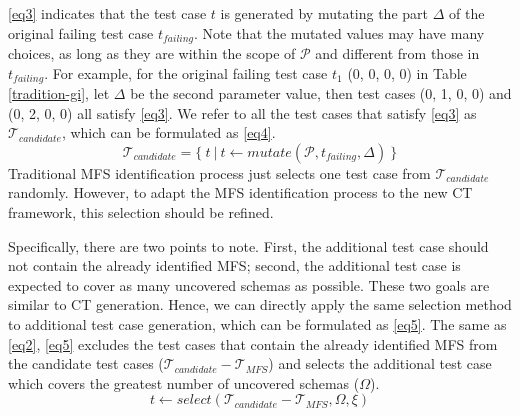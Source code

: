 \documentclass[journal,12pt,onecolumn,draftclsnofoot,]{IEEEtran}
\begin{document}
\ref{eq3} indicates that the test case $t$ is generated by mutating the part $\Delta$ of the original failing test case $t_{failing}$. Note that the mutated values may have many choices, as long as they are within the scope of $\mathcal{P}$ and different from those in $t_{failing}$. For example, for the original failing test case $t_{1}$ (0, 0, 0, 0) in Table \ref{tradition-gi}, let $\Delta$ be the second parameter value, then test cases (0, 1, 0, 0) and (0, 2, 0, 0) all satisfy \ref{eq3}. We refer to all the test cases that satisfy \ref{eq3} as $\mathcal{T}_{candidate}$, which can be formulated  as   \ref{eq4}.
\begin{displaymath}\mathcal{T}_{candidate} =  \{\ t\ |\ t \leftarrow  mutate (\mathcal{P}, t_{failing}, \Delta )\ \} \tag{EQ4} \label{eq4} \end{displaymath}
Traditional MFS identification process just selects one test case from $\mathcal{T}_{candidate}$ randomly. However, to adapt the MFS identification process to the new CT framework, this selection should be refined.

Specifically, there are two points to note. First, the additional test case should not contain the already identified MFS; second, the additional test case is expected to cover as many uncovered schemas as possible. These two goals are similar to CT generation. Hence, we can directly apply the same selection method to additional test case generation, which can be formulated as \ref{eq5}.  The same as \ref{eq2}, \ref{eq5} excludes the test cases that contain the already identified MFS from the candidate test cases ($\mathcal{T}_{candidate} - \mathcal{T}_{MFS}$) and selects the additional test case which covers the greatest number of uncovered schemas ($\Omega$).
\begin{displaymath}t \leftarrow  select (\mathcal{T}_{candidate} - \mathcal{T}_{MFS}, \Omega ,  \xi )  \tag{EQ5} \label{eq5} \end{displaymath}





\end{document}
